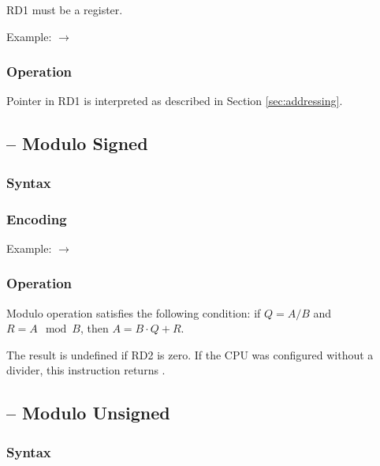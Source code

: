 \documentclass[a4paper,12pt,twoside,extrafontsizes]{memoir}
\begin{document}
{

RD1 must be a register.

Example:  $\rightarrow$ 

\subsubsection{Operation}


Pointer in RD1 is interpreted as described in Section \ref{sec:addressing}.

\subsection{ -- Modulo Signed}
\label{subsec:instr:mods}

\subsubsection{Syntax}


\subsubsection{Encoding}


Example:  $\rightarrow$ 

\subsubsection{Operation}


Modulo operation satisfies the following condition: if $Q=A/B$ and $R=A \mod B$, then $A=B \cdot Q+R$.

The result is undefined if RD2 is zero. If the CPU was configured without a divider, this instruction returns .

\subsection{ -- Modulo Unsigned}
\label{subsec:instr:modu}

\subsubsection{Syntax}

}
\end{document}

